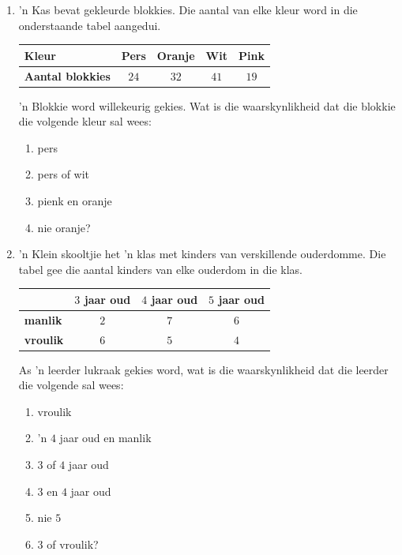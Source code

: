 \begin{exercises}{}
{
  \begin{enumerate}[itemsep=3pt, label=\textbf{\arabic*}.]
  \item  'n Kas bevat gekleurde blokkies. Die aantal van elke kleur word in die onderstaande tabel aangedui.

  \begin{center}
      \begin{tabular}{|l|c|c|c|c|}
        \hline
        \textbf{Kleur} & Pers & Oranje & Wit & Pink \\ \hline
       
        \textbf{Aantal blokkies} & $24$ & $32$ & $41$ & $19$ \\ \hline
   
      \end{tabular}
    \end{center}
    'n Blokkie word willekeurig gekies. Wat is die waarskynlikheid dat die blokkie die volgende kleur sal wees:
    \begin{enumerate}[noitemsep, label=\textbf{(\alph*)} ]
    \item pers
    \item pers of wit
    \item pienk en oranje
    \item nie oranje?
    \end{enumerate}

  \item 'n Klein skooltjie het 'n klas met kinders van verskillende ouderdomme. Die tabel gee die aantal kinders van elke ouderdom in die klas.

    \begin{center}
      \begin{tabular}{|l|c|c|c|}
        \hline
               & $3$ jaar oud & $4$ jaar oud & $5$ jaar oud \\\hline
   
        \textbf{manlik}   & $2$ & $7$ & $6$ \\\hline
        \textbf{vroulik} & $6$ & $5$ & $4$ \\\hline
       
      \end{tabular}
    \end{center}

    As 'n leerder lukraak gekies word, wat is die waarskynlikheid dat die leerder die volgende sal wees:
    \begin{enumerate}[noitemsep, label=\textbf{(\alph*)} ]
    \item vroulik
    \item 'n $4$ jaar oud en manlik 
    \item $3$ of $4$ jaar oud
    \item $3$ en $4$ jaar oud
    \item nie $5$
    \item $3$ of vroulik?
    \end{enumerate}


\end{enumerate}}
\end{exercises}

